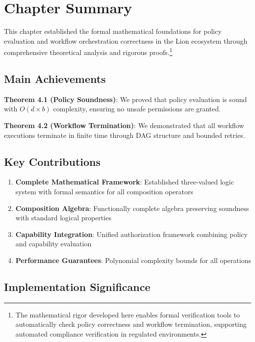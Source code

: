 \newpage

\section{Chapter Summary}

This chapter established the formal mathematical foundations for policy evaluation and workflow orchestration correctness in the Lion ecosystem through comprehensive theoretical analysis and rigorous proofs.\footnote{The mathematical rigor developed here enables formal verification tools to automatically check policy correctness and workflow termination, supporting automated compliance verification in regulated environments.}

\newpage

\subsection{Main Achievements}

\textbf{Theorem 4.1 (Policy Soundness)}: We proved that policy evaluation is sound with $O(d \times b)$ complexity, ensuring no unsafe permissions are granted.

\textbf{Theorem 4.2 (Workflow Termination)}: We demonstrated that all workflow executions terminate in finite time through DAG structure and bounded retries.

\subsection{Key Contributions}

\begin{enumerate}
\item \textbf{Complete Mathematical Framework}: Established three-valued logic system with formal semantics for all composition operators
\item \textbf{Composition Algebra}: Functionally complete algebra preserving soundness with standard logical properties
\item \textbf{Capability Integration}: Unified authorization framework combining policy and capability evaluation
\item \textbf{Performance Guarantees}: Polynomial complexity bounds for all operations
\end{enumerate}

\subsection{Implementation Significance}

